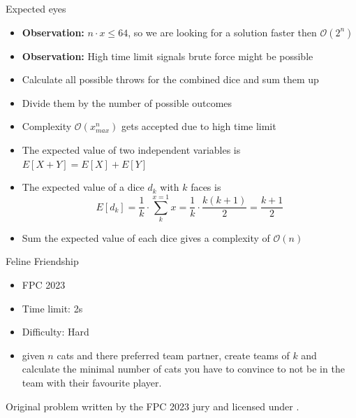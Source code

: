 \documentclass[11pt,pdf, aspectratio=169]{beamer}
\begin{document}
  \begin{frame}{Expected eyes}
    \begin{itemize}
      \item<1-> \textbf{Observation:} $n\cdot x \leq 64$, so we are looking for a solution faster then $\mathcal{O}(2^n)$
      \item<1-> \textbf{Observation:} High time limit signals brute force might be possible
      \item<2-> Calculate all possible throws for the combined dice and sum them up
      \item<2-> Divide them by the number of possible outcomes
      \item<2-> Complexity $\mathcal{O}(x_{max}^n)$ gets accepted due to high time limit
      \item<3-> The expected value of two independent variables is $E[X+Y] = E[X]+E[Y]$
      \item<4-> The expected value of a dice $d_k$ with $k$ faces is \\
      \[E[d_k] = \frac{1}{k}\cdot \sum_{k}^{x=1} x = \frac{1}{k}\cdot\frac{k(k+1)}{2} = \frac{k+1}{2}\]
      \item<5-> Sum the expected value of each dice gives a complexity of $\mathcal{O}(n)$
    \end{itemize}
  \end{frame}
  \begin{frame}{Feline Friendship}
    \begin{itemize}
      \item FPC 2023
      \item Time limit: 2s
      \item Difficulty: Hard
      \item given $n$ cats and there preferred team partner, create teams of $k$ and calculate the minimal number of cats you have to convince to not be in the team with their favourite player.
    \end{itemize}
    Original problem written by the FPC 2023 jury and licensed under \doclicenseLongNameRef.

    \doclicenseImage

  \end{frame}
\end{document}
